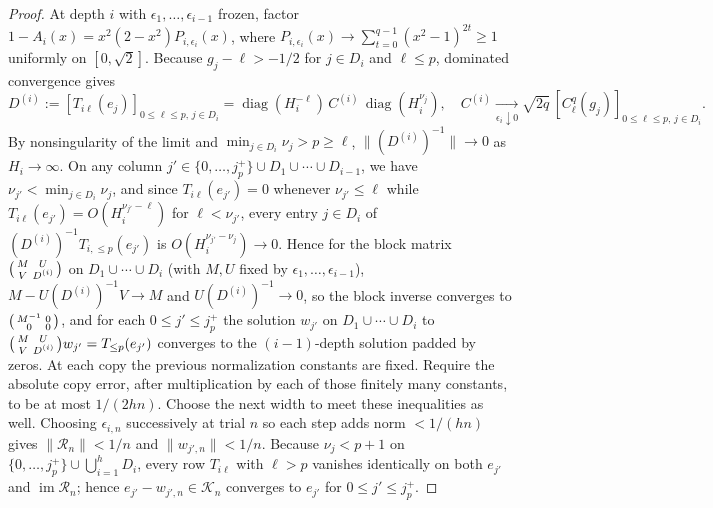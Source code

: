 \begin{proof}
At depth $i$ with $\epsilon_1,\dots,\epsilon_{i-1}$ frozen, factor $1-A_i(x)=x^2(2-x^2)P_{i,\epsilon_i}(x)$, where $P_{i,\epsilon_i}(x)\to\sum_{t=0}^{q-1}(x^2-1)^{2t}\ge 1$ uniformly on $[0,\sqrt{2}]$. Because $g_j-\ell>-1/2$ for $j\in D_i$ and $\ell\le p$, dominated convergence gives
\[
  D^{(i)} := [T_{i\ell}(e_j)]_{0\le\ell\le p,\,j\in D_i}
  = \operatorname{diag}(H_i^{-\ell})\,C^{(i)}\,\operatorname{diag}(H_i^{\nu_j}), \quad
  C^{(i)} \xrightarrow[\epsilon_i\downarrow 0]{} \sqrt{2q}\,[C_\ell^q(g_j)]_{0\le\ell\le p,\,j\in D_i}.
\]
By nonsingularity of the limit and $\min_{j\in D_i}\nu_j>p\ge\ell$, $\|(D^{(i)})^{-1}\|\to 0$ as $H_i\to\infty$. On any column $j'\in\{0,\dots,j_p^+\}\cup D_1\cup\cdots\cup D_{i-1}$, we have $\nu_{j'}<\min_{j\in D_i}\nu_j$, and since $T_{i\ell}(e_{j'})=0$ whenever $\nu_{j'}\le\ell$ while $T_{i\ell}(e_{j'})=O(H_i^{\nu_{j'}-\ell})$ for $\ell<\nu_{j'}$, every entry $j\in D_i$ of $(D^{(i)})^{-1}T_{i,\le p}(e_{j'})$ is $O(H_i^{\nu_{j'}-\nu_j})\to 0$. Hence for the block matrix $\begin{psmallmatrix} M & U \\ V & D^{(i)}\end{psmallmatrix}$ on $D_1\cup\cdots\cup D_i$ (with $M,U$ fixed by $\epsilon_1,\dots,\epsilon_{i-1}$), $M-U(D^{(i)})^{-1}V\to M$ and $U(D^{(i)})^{-1}\to 0$, so the block inverse converges to $\begin{psmallmatrix} M^{-1} & 0 \\ 0 & 0 \end{psmallmatrix}$, and for each $0\le j'\le j_p^+$ the solution $w_{j'}$ on $D_1\cup\cdots\cup D_i$ to $\begin{psmallmatrix} M & U \\ V & D^{(i)}\end{psmallmatrix}w_{j'}=T_{\le p}(e_{j'})$ converges to the $(i-1)$-depth solution padded by zeros. At each copy the previous normalization constants are fixed. Require the absolute copy error, after multiplication by each of those finitely many constants, to be at most $1/(2hn)$. Choose the next width to meet these inequalities as well. Choosing $\epsilon_{i,n}$ successively at trial $n$ so each step adds norm $<1/(hn)$ gives $\|\mathcal{R}_n\|<1/n$ and $\|w_{j',n}\|<1/n$. Because $\nu_j<p+1$ on $\{0,\dots,j_p^+\}\cup\bigcup_{i=1}^h D_i$, every row $T_{i\ell}$ with $\ell>p$ vanishes identically on both $e_{j'}$ and $\operatorname{im}\mathcal{R}_n$; hence $e_{j'}-w_{j',n}\in\mathcal{K}_n$ converges to $e_{j'}$ for $0\le j'\le j_p^+$.
\end{proof}

